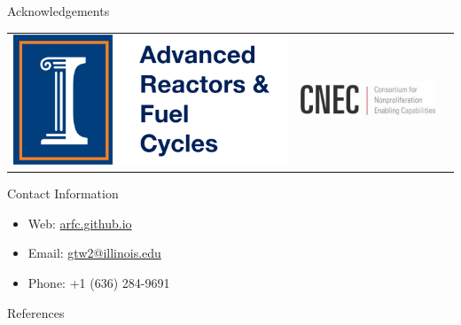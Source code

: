 \documentclass[final]{beamer}
\newlength{\onecolwid}
\newlength{\threecolwid}
\begin{document}
\begin{frame}[t]
\begin{columns}[t,totalwidth=\threecolwid]
\begin{column}{\onecolwid}
\begin{block}{Acknowledgements}
	\vspace{10mm}
	\begin{center}
		\begin{tabular}{ccc}
			\includegraphics[width=0.3\linewidth]{logo.png} & \includegraphics[width=0.3\linewidth]{cnec_oldlogo.png}
		\end{tabular}
	\end{center}
	
	
\end{block}





\begin{alertblock}{Contact Information}
	\begin{itemize}
		
		\item Web: \href{arfc.github.io}{arfc.github.io}
		\item Email: \href{mailto:gtw2@illinois.edu}{gtw2@illinois.edu}
		\item Phone: +1 (636) 284-9691
	\end{itemize}
	
\end{alertblock}

\begin{block}{References}

        {\footnotesize 
        }
\end{block}





\end{column} %

\end{columns} %

\end{frame} %
\end{document}
